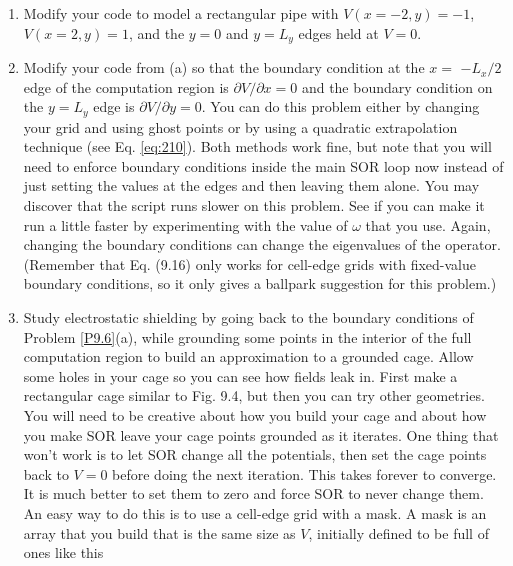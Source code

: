 \begin{problem}\label{P9.6}
\begin{enumerate}[label=(\alph*)]
\item Modify your code to model a rectangular pipe with $V(x=-2, y)=-1$, $V(x=2, y)=1$, and the $y=0$ and $y=L_{y}$ edges held at $V=0$.
\item Modify your code from (a) so that the boundary condition at the $x=$ $-L_{x} / 2$ edge of the computation region is $\partial V / \partial x=0$ and the boundary condition on the $y=L_{y}$ edge is $\partial V / \partial y=0$. You can do this problem either by changing your grid and using ghost points or by using a quadratic extrapolation technique (see Eq. \ref{eq:210}). Both methods work fine, but note that you will need to enforce boundary conditions inside the main SOR loop now instead of just setting the values at the edges and then leaving them alone.
You may discover that the script runs slower on this problem. See if you can make it run a little faster by experimenting with the value of $\omega$ that you use. Again, changing the boundary conditions can change the eigenvalues of the operator. (Remember that Eq. (9.16) only works for cell-edge grids with fixed-value boundary conditions, so it only gives a ballpark suggestion for this problem.)
\item Study electrostatic shielding by going back to the boundary conditions of Problem \ref{P9.6}(a), while grounding some points in the interior of the full computation region to build an approximation to a grounded cage. Allow some holes in your cage so you can see how fields leak in. First make a rectangular cage similar to Fig. 9.4, but then you can try other geometries.
You will need to be creative about how you build your cage and about how you make SOR leave your cage points grounded as it iterates. One thing that won\rq t work is to let SOR change all the potentials, then set the cage points back to $V=0$ before doing the next iteration. This takes forever to converge. It is much better to set them to zero and force SOR to never change them. An easy way to do this is to use a cell-edge grid with a mask. A mask is an array that you build that is the same size as $V$, initially defined to be full of ones like this

\end{enumerate}
\end{problem}
